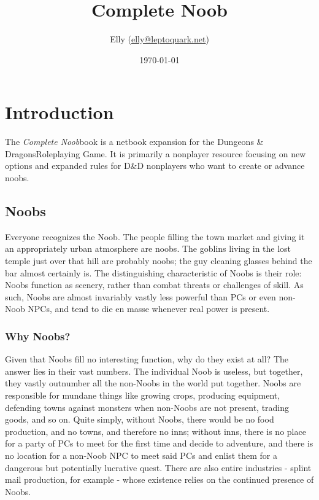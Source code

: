 \documentclass[11pt]{report}
\title{Complete Noob}
\author{Elly (\url{elly@leptoquark.net})}
\date{\today}
\begin{document}
\newcommand{\btitle}[0]{\textit{Complete Noob}}
\newcommand{\dandd}[0]{{\sc Dungeons \& Dragons}}
\newcommand{\tblbg}[0]{\rowcolor[rgb]{0.9,0.9,1.0}}

\maketitle
\tableofcontents

\chapter{Introduction}
The \btitle book is a netbook expansion for the \dandd Roleplaying Game. It is
primarily a nonplayer resource focusing on new options and expanded rules for
D\&D nonplayers who want to create or advance noobs.

\section{Noobs}
Everyone recognizes the Noob. The people filling the town market and giving it
an appropriately urban atmosphere are noobs. The goblins living in the lost
temple just over that hill are probably noobs; the guy cleaning glasses behind
the bar almost certainly is. The distinguishing characteristic of Noobs is their
role: Noobs function as scenery, rather than combat threats or challenges of
skill. As such, Noobs are almost invariably vastly less powerful than PCs or
even non-Noob NPCs, and tend to die en masse whenever real power is present.

\subsection{Why Noobs?}
Given that Noobs fill no interesting function, why do they exist at all? The
answer lies in their vast numbers. The individual Noob is useless, but together,
they vastly outnumber all the non-Noobs in the world put together. Noobs are
responsible for mundane things like growing crops, producing equipment,
defending towns against monsters when non-Noobs are not present, trading goods,
and so on. Quite simply, without Noobs, there would be no food production, and
no towns, and therefore no inns; without inns, there is no place for a party of
PCs to meet for the first time and decide to adventure, and there is no location
for a non-Noob NPC to meet said PCs and enlist them for a dangerous but
potentially lucrative quest. There are also entire industries - splint mail
production, for example - whose existence relies on the continued presence of
Noobs.
\end{document}
